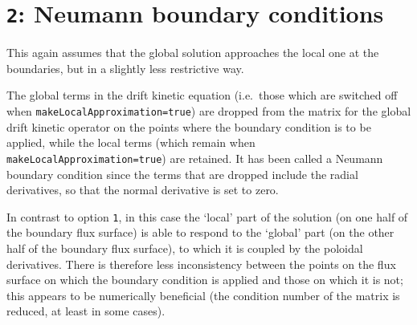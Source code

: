 \documentclass[12pt]{article}
\begin{document}
\section*{{\tt 2}: Neumann boundary conditions}

This again assumes that the global solution approaches the local one at the
boundaries, but in a slightly less restrictive way.

The global terms in the drift kinetic equation (i.e.~those which are switched
off when {\tt makeLocalApproximation=true}) are dropped from the matrix for the
global drift kinetic operator on the points where the boundary condition is to
be applied, while the local terms (which remain when {\tt
makeLocalApproximation=true}) are retained. It has been called a Neumann
boundary condition since the terms that are dropped include the radial
derivatives, so that the normal derivative is set to zero.

In contrast to option {\tt 1}, in this case the `local' part of the solution (on
one half of the boundary flux surface) is able to respond to the `global' part
(on the other half of the boundary flux surface), to which it is coupled by the
poloidal derivatives. There is therefore less inconsistency between the points
on the flux surface on which the boundary condition is applied and those on
which it is not; this appears to be numerically beneficial (the condition number
of the matrix is reduced, at least in some cases).
\end{document}
